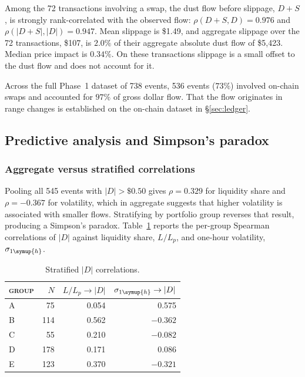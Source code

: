 \documentclass[11pt,a4paper]{article}
\DeclareRobustCommand{\thd}[1]{{\scshape\addfontfeatures{LetterSpace=1.5}\MakeLowercase{#1}}}
\theoremstyle{siphon}
\begin{document}
Among the 72 transactions involving a swap, the dust flow before slippage, $D + S$, is strongly rank-correlated with the observed flow: $\rho(D + S, D) = 0.976$ and $\rho(|D + S|, |D|) = 0.947$. Mean slippage is \$1.49, and aggregate slippage over the 72 transactions, \$107, is $2.0\%$ of their aggregate absolute dust flow of \$5{,}423. Median price impact is $0.34\%$. On these transactions slippage is a small offset to the dust flow and does not account for it.

Across the full Phase~1 dataset of 738 events, 536 events ($73\%$) involved on-chain swaps and accounted for $97\%$ of gross dollar flow. That the flow originates in range changes is established on the on-chain dataset in \S\ref{sec:ledger}.

\subsection{Predictive analysis and Simpson's paradox}\label{sec:predictive}

\subsubsection{Aggregate versus stratified correlations}

Pooling all 545 events with $|D| > \$0.50$ gives $\rho = 0.329$ for liquidity share and $\rho = -0.367$ for volatility, which in aggregate suggests that higher volatility is associated with smaller flows. Stratifying by portfolio group reverses that result, producing a Simpson's paradox. Table~\ref{tab:stratified-correlations} reports the per-group Spearman correlations of $|D|$ against liquidity share, $L/L_p$, and one-hour volatility, $\sigma_{1\symup{h}}$.

\begin{table}[!htb]
\centering
\caption{Stratified $|D|$ correlations.}
\label{tab:stratified-correlations}
\begin{tabular}{@{}lrrr@{}}
\toprule
\thd{Group} & $N$ & $L/L_p \to |D|$ & $\sigma_{1\symup{h}} \to |D|$  \\
\midrule
A & 75  & 0.054           & 0.575 \\
B & 114 & 0.562  & $-0.362$ \\
C & 55  & 0.210           & $-0.082$ \\
D & 178 & 0.171           & $0.086$ \\
E & 123 & 0.370  & $-0.321$ \\
\bottomrule
\end{tabular}
\end{table}
\end{document}
